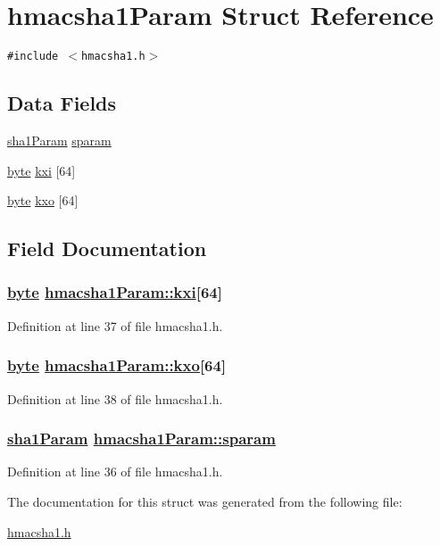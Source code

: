\hypertarget{structhmacsha1Param}{
\section{hmacsha1Param Struct Reference}
\label{structhmacsha1Param}
}
{\tt \#include $<$hmacsha1.h$>$}

\subsection*{Data Fields}
\begin{CompactItemize}
\item 
\hyperlink{structsha1Param}{sha1Param} \hyperlink{structhmacsha1Param_o0}{sparam}
\item 
\hyperlink{beecrypt_8api_8h_a3}{byte} \hyperlink{structhmacsha1Param_o1}{kxi} \mbox{[}64\mbox{]}
\item 
\hyperlink{beecrypt_8api_8h_a3}{byte} \hyperlink{structhmacsha1Param_o2}{kxo} \mbox{[}64\mbox{]}
\end{CompactItemize}


\subsection{Field Documentation}
\hypertarget{structhmacsha1Param_o1}{
\subsubsection[kxi]{\setlength{\rightskip}{0pt plus 5cm}\hyperlink{beecrypt_8api_8h_a3}{byte} \hyperlink{structhmacsha1Param_o1}{hmacsha1Param::kxi}\mbox{[}64\mbox{]}}}
\label{structhmacsha1Param_o1}


Definition at line 37 of file hmacsha1.h.\hypertarget{structhmacsha1Param_o2}{
\subsubsection[kxo]{\setlength{\rightskip}{0pt plus 5cm}\hyperlink{beecrypt_8api_8h_a3}{byte} \hyperlink{structhmacsha1Param_o2}{hmacsha1Param::kxo}\mbox{[}64\mbox{]}}}
\label{structhmacsha1Param_o2}


Definition at line 38 of file hmacsha1.h.\hypertarget{structhmacsha1Param_o0}{
\subsubsection[sparam]{\setlength{\rightskip}{0pt plus 5cm}\hyperlink{structsha1Param}{sha1Param} \hyperlink{structhmacsha1Param_o0}{hmacsha1Param::sparam}}}
\label{structhmacsha1Param_o0}


Definition at line 36 of file hmacsha1.h.

The documentation for this struct was generated from the following file:\begin{CompactItemize}
\item 
\hyperlink{hmacsha1_8h}{hmacsha1.h}\end{CompactItemize}
